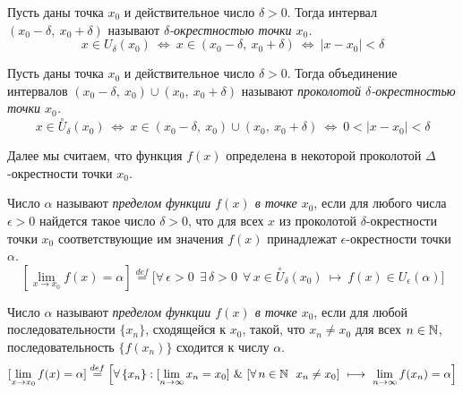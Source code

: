 

\begin{definition}
Пусть даны точка \(x_{0}\) и действительное число \(\delta > 0\). Тогда интервал
\((x_{0} - \delta, ~ x_{0} + \delta)\) называют \textit{\(\delta\)-окрестностью точки \(x_{0}\).}
\[
x \in U_{\delta}(x_{0}) ~ \Leftrightarrow ~ x \in (x_{0} - \delta, ~ x_{0} + \delta)
~ \Leftrightarrow ~ |x - x_{0}| < \delta
\]
\end{definition}

\begin{definition}
Пусть даны точка \(x_{0}\) и действительное число \(\delta > 0\).
Тогда объединение интервалов \((x_{0} - \delta, ~ x_{0}) \cup (x_{0}, ~ x_{0} + \delta)\)
называют \textit{проколотой \(\delta\)-окрестностью точки \(x_{0}\).}
\[
x \in \overset{\circ}{U}_{\delta}(x_{0}) ~ \Leftrightarrow ~
x \in (x_{0} - \delta, ~ x_{0}) \cup (x_{0}, ~ x_{0} + \delta)
~ \Leftrightarrow ~ 0 < |x - x_{0}| < \delta
\]
\end{definition}

Далее мы считаем, что функция \(f(x)\) определена в
некоторой проколотой \(\Delta\)-окрестности точки \(x_{0}\).

\begin{definition}[По Коши] \label{def_lim_Koshi}
Число \(\alpha\) называют \textit{пределом функции \(f(x)\) в точке \(x_{0}\)},
если для любого числа \(\epsilon > 0\) найдется такое число \(\delta > 0\),
что для всех \(x\) из проколотой \(\delta\)-окрестности точки \(x_{0}\)
соответствующие им значения \(f(x)\) принадлежат \(\epsilon\)-окрестности точки \(\alpha\).
\[
[\lim_{ x \to x_{0} } f(x) = \alpha ] \overset{def}{=} \Big[ \forall \, \epsilon > 0
~~ \exists \, \delta > 0 ~~ \forall \, x \in \overset{\circ}{U}_\delta(x_{0})
~ \longmapsto ~ f(x) \in U_{\epsilon}(\alpha) \Big]
\]
\end{definition}

\begin{definition}[По Гейне]
Число \(\alpha\) называют \textit{пределом функции \(f(x)\) в точке \(x_{0}\)},
если для любой последовательности \(\{x_{n}\}\), сходящейся к \(x_{0}\), такой,
что \(x_{n} \neq x_{0}\) для всех \(n \in \mathbb{N}\), последовательность
\(\{f(x_{n})\}\) сходится к числу \(\alpha\).
\[
[\lim_{ x \to x_{0} } f(x) = \alpha ] \overset{def}{=} \Big[ \forall \, \{x_{n}\}:
[\lim_{ n \to \infty } x_{n} = x_{0}] ~ \& ~ [\forall \, n \in \mathbb{N} ~~ x_{n} \neq x_{0}]
~ \longmapsto ~ \lim_{ n \to \infty } f(x_{n}) = \alpha \Big]
\]
\end{definition}

